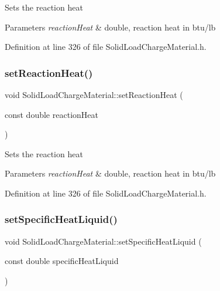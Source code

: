 Sets the reaction heat 
\begin{DoxyParams}{Parameters}
{\em reaction\+Heat} & double, reaction heat in btu/lb \\
\hline
\end{DoxyParams}


Definition at line 326 of file Solid\+Load\+Charge\+Material.\+h.

\mbox{\label{class_solid_load_charge_material_a9c3cd28b2b31fb66eea984d9030cd247}} 
\subsubsection{\texorpdfstring{set\+Reaction\+Heat()}{setReactionHeat()}\hspace{0.1cm}{\footnotesize\ttfamily [3/3]}}
{\footnotesize\ttfamily void Solid\+Load\+Charge\+Material\+::set\+Reaction\+Heat (\begin{DoxyParamCaption}\item[{const double}]{reaction\+Heat }\end{DoxyParamCaption})\hspace{0.3cm}{\ttfamily [inline]}}

Sets the reaction heat 
\begin{DoxyParams}{Parameters}
{\em reaction\+Heat} & double, reaction heat in btu/lb \\
\hline
\end{DoxyParams}


Definition at line 326 of file Solid\+Load\+Charge\+Material.\+h.

\mbox{\label{class_solid_load_charge_material_a91fad347bf52a4f6695c304904091797}} 
\subsubsection{\texorpdfstring{set\+Specific\+Heat\+Liquid()}{setSpecificHeatLiquid()}\hspace{0.1cm}{\footnotesize\ttfamily [1/3]}}
{\footnotesize\ttfamily void Solid\+Load\+Charge\+Material\+::set\+Specific\+Heat\+Liquid (\begin{DoxyParamCaption}\item[{const double}]{specific\+Heat\+Liquid }\end{DoxyParamCaption})\hspace{0.3cm}{\ttfamily [inline]}}

